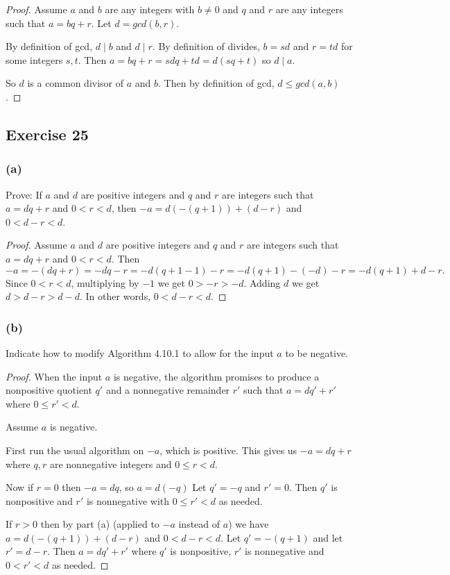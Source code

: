 \documentclass[14pt]{extarticle}
\begin{document}
\begin{proof}
    Assume $a$ and $b$ are any integers with $b \neq 0$ and $q$ and $r$ are any integers such that $a = bq + r$. Let $d = gcd(b,r)$.

    By definition of gcd, $d \mid b$ and $d \mid r$. By definition of divides, $b = sd$ and $r = td$ for some integers $s, t$. Then $a = bq+r = sdq + td = d(sq + t)$ so $d \mid a$.

    So $d$ is a common divisor of $a$ and $b$. Then by definition of gcd, $d \leq gcd(a,b)$.
\end{proof}

\subsection{Exercise 25}
\subsubsection{(a)}
Prove: If $a$ and $d$ are positive integers and $q$ and $r$ are integers such that $a = dq + r$ and $0 < r < d$, then
$-a = d(-(q + 1)) + (d - r)$ and $0 < d - r < d$.

\begin{proof}
    Assume $a$ and $d$ are positive integers and $q$ and $r$ are integers such that $a = dq + r$ and $0 < r < d$. Then
    \[
        -a = -(dq+r) = -dq-r = -d(q+1-1)-r = -d(q+1) -(-d) - r = -d(q+1) + d - r.
    \]
    Since $0 < r < d$, multiplying by $-1$ we get $0 > -r > -d$. Adding $d$ we get $d > d-r > d-d$. In other words, $0 < d-r < d$.
\end{proof}

\subsubsection{(b)}
Indicate how to modify Algorithm 4.10.1 to allow for the input $a$ to be negative.

\begin{proof}
    When the input $a$ is negative, the algorithm promises to produce a nonpositive quotient $q'$ and a nonnegative remainder $r'$ such that $a = dq' + r'$ where $0 \leq r' < d$.

    Assume $a$ is negative.

    First run the usual algorithm on $-a$, which is positive. This gives us $-a = dq + r$ where $q,r$ are nonnegative integers and $0 \leq r < d$.

    Now if $r = 0$ then $-a = dq$, so $a = d(-q)$ Let $q' = -q$ and $r' = 0$. Then $q'$ is nonpositive and $r'$ is nonnegative with $0 \leq r' < d$ as needed.

    If $r > 0$ then by part (a) (applied to $-a$ instead of $a$) we have $a = d(-(q + 1)) + (d - r)$ and $0 < d - r < d$. Let $q' = -(q+1)$ and let $r' = d-r$. Then $a = dq' + r'$ where $q'$ is nonpositive, $r'$ is nonnegative and $0 < r' < d$ as needed.
\end{proof}
\end{document}
